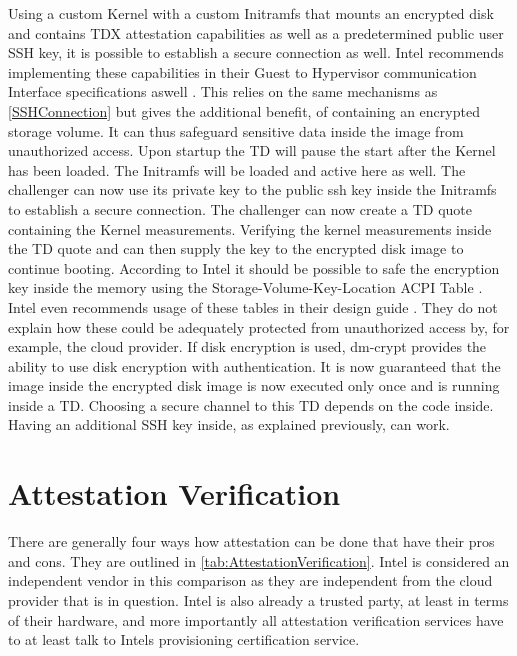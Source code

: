 Using a custom Kernel with a custom Initramfs that mounts an encrypted disk and contains TDX attestation capabilities as well as a predetermined public user SSH key, it is possible to establish a secure connection as well. Intel recommends implementing these capabilities in their Guest to Hypervisor communication Interface specifications aswell \cite{intel_corporation_guest_hypervisor}. This relies on the same mechanisms as \ref{SSHConnection} but gives the additional benefit, of containing an encrypted storage volume. It can thus safeguard sensitive data inside the image from unauthorized access. Upon startup the TD will pause the start after the Kernel has been loaded. The Initramfs will be loaded and active here as well. The challenger can now use its private key to the public ssh key inside the Initramfs to establish a secure connection. The challenger can now create a TD quote containing the Kernel measurements. Verifying the kernel measurements inside the TD quote and can then supply the key to the encrypted disk image to continue booting. According to Intel it should be possible to safe the encryption key inside the memory using the Storage-Volume-Key-Location ACPI Table \cite{intel_corporation_guest_hypervisor}. Intel even recommends usage of these tables in their design guide \cite{intel_corporation_guest_hypervisor}. They do not explain how these could be adequately protected from unauthorized access by, for example, the cloud provider. If disk encryption is used, dm-crypt provides the ability to use disk encryption with authentication. It is now guaranteed that the image inside the encrypted disk image is now executed only once and is running inside a TD. Choosing a secure channel to this TD depends on the code inside. Having an additional SSH key inside, as explained previously, can work.

\section{Attestation Verification}

There are generally four ways how attestation can be done that have their pros and cons. They are outlined in \cref{tab:AttestationVerification}. Intel is considered an independent vendor in this comparison as they are independent from the cloud provider that is in question. Intel is also already a trusted party, at least in terms of their hardware, and more importantly all attestation verification services have to at least talk to Intels provisioning certification service.

